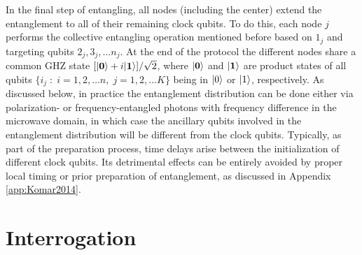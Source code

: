 In the final step of entangling, all nodes (including the center) extend the
entanglement to all of their remaining clock qubits. To do this, each node $j$
performs the collective entangling operation mentioned before based on
$1_j$ and targeting qubits $2_j, 3_j, \dots n_j$.  At the end of the protocol the different nodes share a common
GHZ state $[| \mathbf{0} \rangle + i| \mathbf{1} \rangle]/\sqrt{2}$, where
$| \mathbf{0} \rangle$ and $| \mathbf{1} \rangle$ are product states of all qubits
$\{i_j\;:\; i=1,2,\dots n,\; j=1,2,\dots K\}$ being in $| 0 \rangle$ or $| 1 \rangle$,
respectively. As discussed below, in practice the entanglement distribution can
be done  either via polarization- or frequency-entangled photons with frequency
difference in the microwave domain, in which case the ancillary qubits involved
in the entanglement distribution will be different from the clock qubits.
Typically, as part of the preparation process, time delays arise between the
initialization of different clock qubits. Its detrimental effects can be
entirely avoided by proper local timing or prior preparation of entanglement, as
discussed in Appendix \ref{app:Komar2014}.

\section{Interrogation}
\label{sec:SA}


